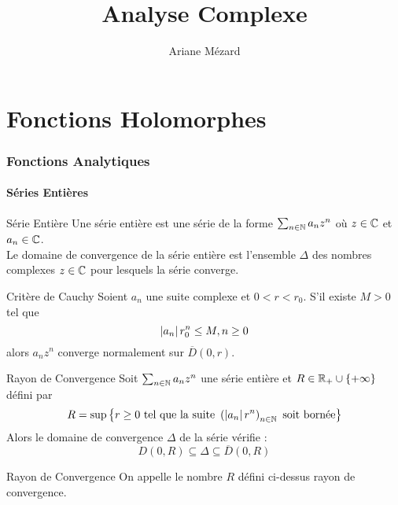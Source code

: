 \documentclass{cours}
\title{Analyse Complexe}
\author{Ariane Mézard}
\begin{document}
\part{Fonctions Holomorphes}
\section{Fonctions Analytiques}
\subsection{Séries Entières}
\begin{définition}{Série Entière}{}
    Une série entière est une série de la forme $\sum_{n \in \mathbb{N}}a_{n}z^{n}$ où $z \in \mathbb{C}$ et $a_{n} \in \mathbb{C}$.\\
    Le domaine de convergence de la série entière est l'ensemble $\Delta$ des nombres complexes $z \in \mathbb{C}$ pour lesquels la série converge.  
\end{définition}
\begin{propositionfr}{Critère de Cauchy}{}
    Soient $a_{n}$ une suite complexe et $0 < r < r_{0}$. S'il existe $M > 0$ tel que 
    \[
        \left|a_{n}\right|r_{0}^{n} \leq M, n \geq 0
    \]
    alors $a_{n}z^{n}$ converge normalement sur $\overline{D}(0, r)$.
\end{propositionfr}

\begin{corollaire}{Rayon de Convergence}{}
    Soit $\sum_{n \in \mathbb{N}} a_{n}z^{n}$ une série entière et $R \in \mathbb{R}_{+} \cup \{+ \infty\}$ défini par 
    \[
        R = \sup \left\{r \geq 0 \text{ tel que la suite } \left(\left|a_{n}\right|r^{n}\right)_{n \in \mathbb{N}} \text{ soit bornée}\right\}
    \]
    Alors le domaine de convergence $\Delta$ de la série vérifie : 
    \[
        D(0, R) \subseteq \Delta \subseteq \overline{D}(0, R)
    \]
\end{corollaire}

\begin{définition}{Rayon de Convergence}{}
    On appelle le nombre $R$ défini ci-dessus rayon de convergence.
\end{définition}
\end{document}
